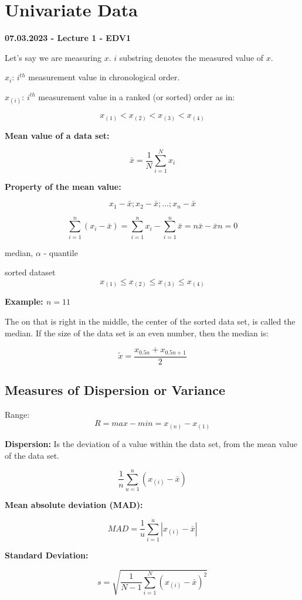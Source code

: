 \section{Univariate Data}

\textbf{07.03.2023 - Lecture 1 - EDV1}


Let's say we are measuring $x$. $i$ substring denotes the measured value of $x$.

$x_i$: $i^{th}$ measurement value in chronological order.

$x_{(i)}$: $i^{th}$ measurement value in a ranked (or sorted) order as in:

$$x_{(1)}<x_{(2)}<x_{(3)}<x_{(4)}$$

\textbf{Mean value of a data set:}

$$\bar{x} = \frac{1}{N} \sum_{i=1}^{N} x_i$$

\textbf{Property of the mean value:}

$$x_1 - \bar{x}; x_2 - \bar{x}; ... ; x_n - \bar{x}$$

$$\sum_{i=1}^{n} (x_i - \bar{x}) = \sum_{i=1}^{n} x_i - \sum_{i=1}^{n}\bar{x} = n\bar{x} - \bar{x}n = 0$$

median, $\alpha$ - quantile

sorted dataset $$x_{(1)} \le x_{(2)} \le x_{(3)} \le x_{(4)}$$

\textbf{Example: $n = 11$}

The on that is right in the middle, the center of the sorted data set, is called the median. If the size of the data set is an even number, then the median is:

$$\tilde{x} = \frac{x_{0.5n}+x_{0.5n+1}}{2}$$

\subsection*{Measures of Dispersion or Variance}

Range:
$$R = {max} - {min} = x_{(n)} - x_{(1)}$$

\textbf{Dispersion:} Is the deviation of a value within the data set, from the mean value of the data set.

$$\frac{1}{n} \sum_{u=1}^{u}(x_{(i)} - \bar{x})$$

\textbf{Mean absolute deviation (MAD):}

$$ MAD = \frac{1}{u} \sum_{i=1}^{u} |x_{(i)} - \bar{x} |$$

\textbf{Standard Deviation:}

$$ s = \sqrt{\frac{1}{N-1} \sum_{i=1}^{N}(x_{(i)} -\bar{x})^2} $$

